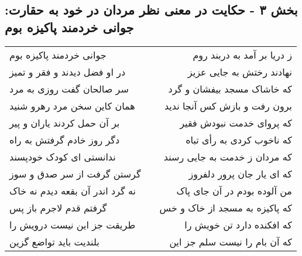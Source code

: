 \begin{center}
\section*{بخش ۳ - حکایت در معنی نظر مردان در خود به حقارت: جوانی خردمند پاکیزه بوم}
\label{sec:003}
\begin{longtable}{l p{0.5cm} r}
جوانی خردمند پاکیزه بوم
&&
ز دریا بر آمد به دربند روم
\\
در او فضل دیدند و فقر و تمیز
&&
نهادند رختش به جایی عزیز
\\
سر صالحان گفت روزی به مرد
&&
که خاشاک مسجد بیفشان و گرد
\\
همان کاین سخن مرد رهرو شنید
&&
برون رفت و بازش کس آنجا ندید
\\
بر آن حمل کردند یاران و پیر
&&
که پروای خدمت نبودش فقیر
\\
دگر روز خادم گرفتش به راه
&&
که ناخوب کردی به رأی تباه
\\
ندانستی ای کودک خودپسند
&&
که مردان ز خدمت به جایی رسند
\\
گرستن گرفت از سر صدق و سوز
&&
که ای یار جان پرور دلفروز
\\
نه گرد اندر آن بقعه دیدم نه خاک
&&
من آلوده بودم در آن جای پاک
\\
گرفتم قدم لاجرم باز پس
&&
که پاکیزه به مسجد از خاک و خس
\\
طریقت جز این نیست درویش را
&&
که افکنده دارد تن خویش را
\\
بلندیت باید تواضع گزین
&&
که آن بام را نیست سلم جز این
\\
\end{longtable}
\end{center}
